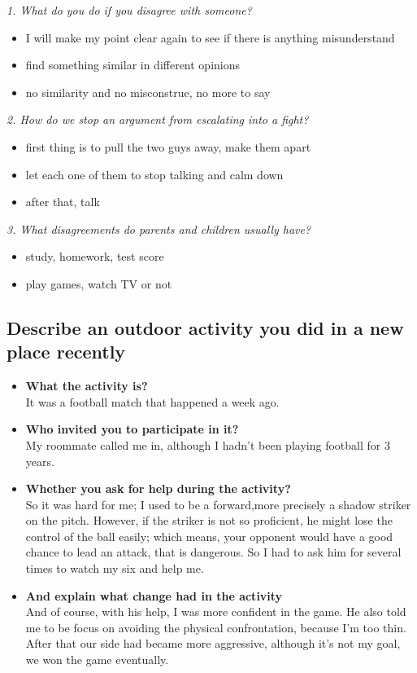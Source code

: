 \documentclass[conference]{IEEEtran}
\begin{document}
\textit{1. What do you do if you disagree with someone?}
\begin{itemize}
    \item I will make my point clear again to see if there is anything misunderstand
    \item find something similar in different opinions
    \item no similarity and no misconstrue, no more to say
\end{itemize}

\textit{2. How do we stop an argument from escalating into a fight?}
\begin{itemize}
    \item first thing is to pull the two guys away, make them apart
    \item let each one of them to stop talking and calm down
    \item after that, talk 
\end{itemize}

\textit{3. What disagreements do parents and children usually have?}
\begin{itemize}
    \item study, homework, test score
    \item play games, watch TV or not
\end{itemize}

\subsection{Describe an outdoor activity you did in a new place recently}
\begin{itemize}
    \item \textbf{What the activity is?}\\
    It was a football match that happened a week ago.
    \item \textbf{Who invited you to participate in it?}\\
    My roommate called me in, although I hadn't been playing football for 3 years. 
    \item \textbf{Whether you ask for help during the activity?}\\
    So it was hard for me;
    I used to be a forward,more precisely a shadow striker on the pitch.
    However, if the striker is not so proficient, he might lose the control of the ball easily;
    which means, your opponent would have a good chance to lead an attack, that is dangerous.
    So I had to ask him for several times to watch my six and help me.
    \item \textbf{And explain what change had in the activity}\\
    And of course, with his help, I was more confident in the game.
    He also told me to be focus on avoiding the physical confrontation, because I'm too thin.
    After that our side had became more aggressive, although it's not my goal, we won the game eventually.
\end{itemize}
\end{document}
